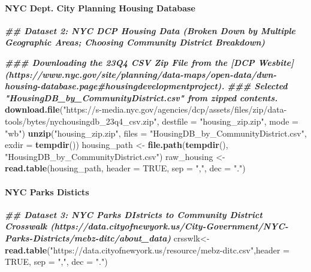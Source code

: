 \documentclass[
]{article}
\newenvironment{Shaded}{\begin{snugshade}}{\end{snugshade}}
\newcommand{\AttributeTok}[1]{\textcolor[rgb]{0.13,0.29,0.53}{#1}}
\newcommand{\ConstantTok}[1]{\textcolor[rgb]{0.56,0.35,0.01}{#1}}
\newcommand{\DocumentationTok}[1]{\textcolor[rgb]{0.56,0.35,0.01}{\textbf{\textit{#1}}}}
\newcommand{\FunctionTok}[1]{\textcolor[rgb]{0.13,0.29,0.53}{\textbf{#1}}}
\newcommand{\NormalTok}[1]{#1}
\newcommand{\OtherTok}[1]{\textcolor[rgb]{0.56,0.35,0.01}{#1}}
\newcommand{\StringTok}[1]{\textcolor[rgb]{0.31,0.60,0.02}{#1}}
\begin{document}
\paragraph{NYC Dept. City Planning Housing
Database}\label{nyc-dept.-city-planning-housing-database}

\begin{Shaded}
\begin{Highlighting}[]
\DocumentationTok{\#\# Dataset 2: NYC DCP Housing Data (Broken Down by Multiple Geographic Area\textquotesingle{}s; Choosing Community District Breakdown)}

\DocumentationTok{\#\#\# Downloading the 23Q4 CSV Zip File from the [DCP Wesbite](https://www.nyc.gov/site/planning/data{-}maps/open{-}data/dwn{-}housing{-}database.page\#housingdevelopmentproject).}
\DocumentationTok{\#\#\# Selected "HousingDB\_by\_CommunityDistrict.csv" from zipped contents.}
\FunctionTok{download.file}\NormalTok{(}\StringTok{"https://s{-}media.nyc.gov/agencies/dcp/assets/files/zip/data{-}tools/bytes/nychousingdb\_23q4\_csv.zip"}\NormalTok{,}
              \AttributeTok{destfile =} \StringTok{"housing\_zip.zip"}\NormalTok{, }\AttributeTok{mode =} \StringTok{"wb"}\NormalTok{)}
\FunctionTok{unzip}\NormalTok{(}\StringTok{"housing\_zip.zip"}\NormalTok{, }\AttributeTok{files =} \StringTok{"HousingDB\_by\_CommunityDistrict.csv"}\NormalTok{, }\AttributeTok{exdir =} \FunctionTok{tempdir}\NormalTok{())}
\NormalTok{housing\_path }\OtherTok{\textless{}{-}} \FunctionTok{file.path}\NormalTok{(}\FunctionTok{tempdir}\NormalTok{(), }\StringTok{"HousingDB\_by\_CommunityDistrict.csv"}\NormalTok{)}
\NormalTok{raw\_housing }\OtherTok{\textless{}{-}} \FunctionTok{read.table}\NormalTok{(housing\_path, }\AttributeTok{header =} \ConstantTok{TRUE}\NormalTok{, }\AttributeTok{sep =} \StringTok{","}\NormalTok{, }\AttributeTok{dec =} \StringTok{"."}\NormalTok{)}
\end{Highlighting}
\end{Shaded}

\paragraph{NYC Parks Disticts}\label{nyc-parks-disticts}

\begin{Shaded}
\begin{Highlighting}[]
\DocumentationTok{\#\# Dataset 3: NYC Parks DIstricts to Community District Crosswalk (https://data.cityofnewyork.us/City{-}Government/NYC{-}Parks{-}Districts/mebz{-}ditc/about\_data)}
\NormalTok{crsswlk}\OtherTok{\textless{}{-}} \FunctionTok{read.table}\NormalTok{(}\StringTok{"https://data.cityofnewyork.us/resource/mebz{-}ditc.csv"}\NormalTok{,}\AttributeTok{header =} \ConstantTok{TRUE}\NormalTok{, }\AttributeTok{sep =} \StringTok{","}\NormalTok{, }\AttributeTok{dec =} \StringTok{"."}\NormalTok{)}
\end{Highlighting}
\end{Shaded}
\end{document}
